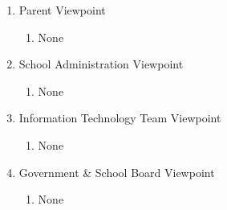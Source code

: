 \documentclass[]{article}
\begin{document}
\begin{enumerate}[{BE}1.]
\begin{enumerate}[{VP2}.1]
		\item Parent Viewpoint
			\begin{enumerate}
				\item None
			\end{enumerate}

		\item School Administration Viewpoint
			\begin{enumerate}
				\item None
			\end{enumerate}

		\item Information Technology Team Viewpoint
			\begin{enumerate}
				\item None
			\end{enumerate}

		\item Government \& School Board Viewpoint
			\begin{enumerate}
				\item None
			\end{enumerate}
	\end{enumerate}


\end{enumerate}
\end{document}
